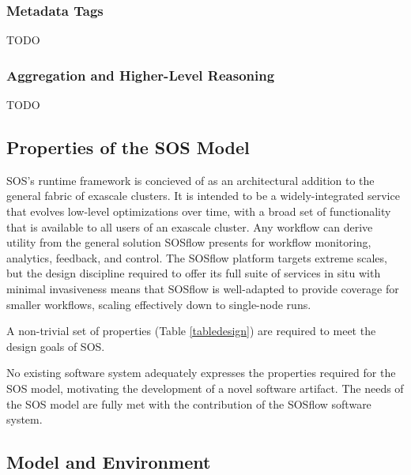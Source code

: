\subsubsection{Metadata Tags}
TODO

\subsubsection{Aggregation and Higher-Level Reasoning}
TODO



\subsection{Properties of the SOS Model}

SOS's runtime framework is concieved of as an architectural addition
to the general fabric of exascale clusters.
%
It is intended to be a widely-integrated service that evolves
low-level optimizations over time, with a broad set of functionality
that is available to all users of an exascale cluster.
%
Any workflow can derive utility from the general solution SOSflow presents
for workflow monitoring, analytics, feedback, and control.
%
The SOSflow platform targets extreme scales, but the design discipline
required to offer its full suite of services in situ with minimal
invasiveness means that SOSflow is well-adapted to provide coverage
for smaller workflows, scaling effectively down to single-node runs.

A non-trivial set of properties (Table \ref{tabledesign}) are required
to meet the design goals of SOS.
%

%
No existing software system adequately expresses the properties required
for the SOS model, motivating the development of a novel software
artifact.
%
The needs of the SOS model are fully met with the contribution of the
SOSflow software system.


\subsection{Model and Environment}


